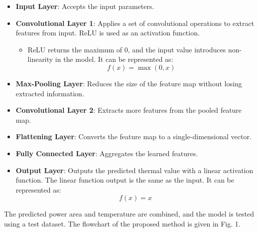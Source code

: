 \documentclass[conference]{IEEEtran}
\begin{document}
\begin{itemize}
	\item \textbf{Input Layer}: Accepts the input parameters.
	
	\item \textbf{Convolutional Layer 1}: Applies a set of convolutional operations to extract features from input. ReLU is used as an activation function.
	\begin{itemize}
		\item ReLU returns the maximum of 0, and the input value introduces non-linearity in the model. It can be represented as:
		\[
		f(x) = \max(0, x)
		\]
	\end{itemize}
	
	\item \textbf{Max-Pooling Layer}: Reduces the size of the feature map without losing extracted information.  
	
	\item \textbf{Convolutional Layer 2}: Extracts more features from the pooled feature map.
	
	\item \textbf{Flattening Layer}: Converts the feature map to a single-dimensional vector.
	
	\item \textbf{Fully Connected Layer}: Aggregates the learned features.
	
	\item \textbf{Output Layer}: Outputs the predicted thermal value with a linear activation function. The linear function output is the same as the input. It can be represented as:
	\[
	f(x) = x
	\]
\end{itemize}
The predicted power area and temperature are combined, and the model is tested using a test dataset. The flowchart of the proposed method is given in Fig. 1.
\end{document}
